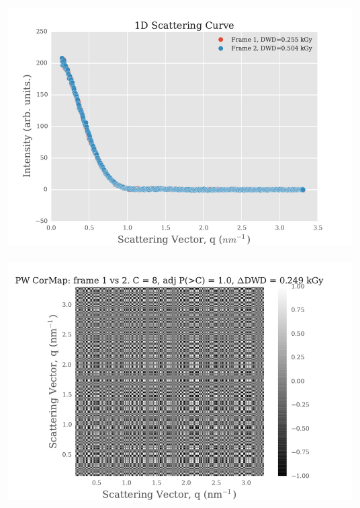 \begin{figure}
    \centering
    \begin{subfigure}[b]{0.45\textwidth}
            \centering
            \includegraphics[width=\textwidth]{figures/saxs/scatter_curve_frames_1_2.pdf}
            \caption{}
            \label{fig:1D scatter plot of frames 1 and 2}
    \end{subfigure}
    \qquad
    \begin{subfigure}[b]{0.45\textwidth}
            \centering
            \includegraphics[width=\textwidth]{figures/saxs/pwcormap_frames_1_2.pdf}
            \caption{}
            \label{fig:Pairwise correlation frames 1 and 2}
    \end{subfigure}
    \\
    \begin{subfigure}[b]{0.45\textwidth}
            \centering

\end{subfigure}
\end{figure}
